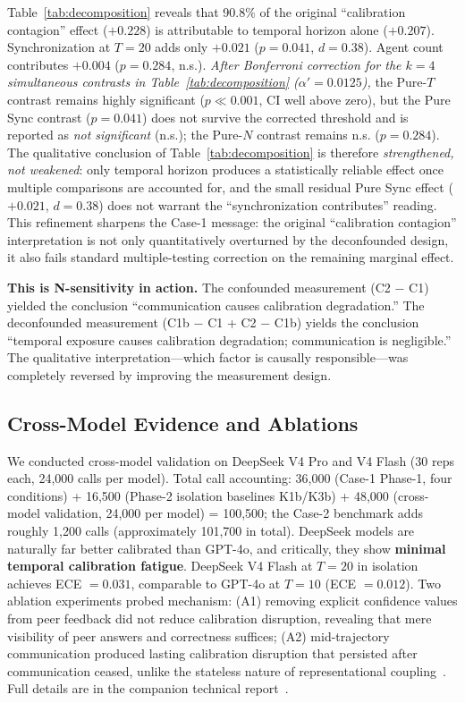 \documentclass[11pt]{article}
\begin{document}
Table~\ref{tab:decomposition} reveals that 90.8\% of the original ``calibration contagion'' effect ($+0.228$) is attributable to temporal horizon alone ($+0.207$). Synchronization at $T{=}20$ adds only $+0.021$ ($p = 0.041$, $d = 0.38$). Agent count contributes $+0.004$ ($p = 0.284$, n.s.). \emph{After Bonferroni correction for the $k{=}4$ simultaneous contrasts in Table~\ref{tab:decomposition} ($\alpha' = 0.0125$),} the Pure-$T$ contrast remains highly significant ($p \ll 0.001$, CI well above zero), but the Pure Sync contrast ($p{=}0.041$) does not survive the corrected threshold and is reported as \emph{not significant} (n.s.); the Pure-$N$ contrast remains n.s. ($p{=}0.284$). The qualitative conclusion of Table~\ref{tab:decomposition} is therefore \emph{strengthened, not weakened}: only temporal horizon produces a statistically reliable effect once multiple comparisons are accounted for, and the small residual Pure Sync effect ($+0.021$, $d{=}0.38$) does not warrant the ``synchronization contributes'' reading. This refinement sharpens the Case-1 message: the original ``calibration contagion'' interpretation is not only quantitatively overturned by the deconfounded design, it also fails standard multiple-testing correction on the remaining marginal effect.

\textbf{This is N-sensitivity in action.} The confounded measurement (C2 $-$ C1) yielded the conclusion ``communication causes calibration degradation.'' The deconfounded measurement (C1b $-$ C1 + C2 $-$ C1b) yields the conclusion ``temporal exposure causes calibration degradation; communication is negligible.'' The qualitative interpretation---which factor is causally responsible---was completely reversed by improving the measurement design.

\subsection{Cross-Model Evidence and Ablations}

We conducted cross-model validation on DeepSeek V4 Pro and V4 Flash (30 reps each, 24,000 calls per model). Total call accounting: 36,000 (Case-1 Phase-1, four conditions) + 16,500 (Phase-2 isolation baselines K1b/K3b) + 48,000 (cross-model validation, 24,000 per model) = 100,500; the Case-2 benchmark adds roughly 1,200 calls (approximately 101,700 in total). DeepSeek models are naturally far better calibrated than GPT-4o, and critically, they show \textbf{minimal temporal calibration fatigue}. DeepSeek V4 Flash at $T{=}20$ in isolation achieves ECE $=0.031$, comparable to GPT-4o at $T{=}10$ (ECE $=0.012$). Two ablation experiments probed mechanism: (A1) removing explicit confidence values from peer feedback did not reduce calibration disruption, revealing that mere visibility of peer answers and correctness suffices; (A2) mid-trajectory communication produced lasting calibration disruption that persisted after communication ceased, unlike the stateless nature of representational coupling~\cite{liu2026boundarysync}. Full details are in the companion technical report~\cite{liu2026calibrationcontagion}.
\end{document}
